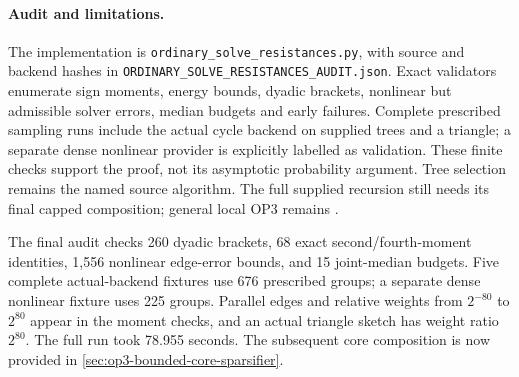 \paragraph{Audit and limitations.}
The implementation is \texttt{ordinary\_solve\_resistances.py}, with
source and backend hashes in \texttt{ORDINARY\_SOLVE\_RESISTANCES\_AUDIT.json}.
Exact validators enumerate sign moments, energy bounds, dyadic brackets,
nonlinear but admissible solver errors, median budgets and early failures.
Complete prescribed sampling runs include the actual cycle backend on
supplied trees and a triangle; a separate dense nonlinear provider is
explicitly labelled as validation. These finite checks support the proof,
not its asymptotic probability argument. Tree selection remains the named
source algorithm. The full supplied recursion still needs its final capped
composition; general local OP3 remains \statusopen.

The final audit checks 260 dyadic brackets, 68 exact second/fourth-moment
identities, 1,556 nonlinear edge-error bounds, and 15 joint-median budgets.
Five complete actual-backend fixtures use 676 prescribed groups; a separate
dense nonlinear fixture uses 225 groups. Parallel edges and relative
weights from $2^{-80}$ to $2^{80}$ appear in the moment checks, and an
actual triangle sketch has weight ratio $2^{80}$. The full run took
78.955 seconds. The subsequent core composition is now provided in
\cref{sec:op3-bounded-core-sparsifier}.
